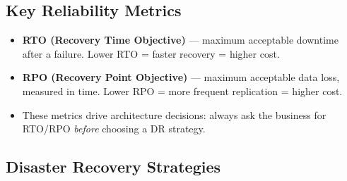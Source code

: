 

\subsection{Key Reliability Metrics}

\begin{keyfacts}
\begin{itemize}
  \item \textbf{RTO (Recovery Time Objective)} --- maximum acceptable downtime after a failure. Lower RTO = faster recovery = higher cost.
  \item \textbf{RPO (Recovery Point Objective)} --- maximum acceptable data loss, measured in time. Lower RPO = more frequent replication = higher cost.
  \item These metrics drive architecture decisions: always ask the business for RTO/RPO \emph{before} choosing a DR strategy.
\end{itemize}
\end{keyfacts}

\subsection{Disaster Recovery Strategies}

